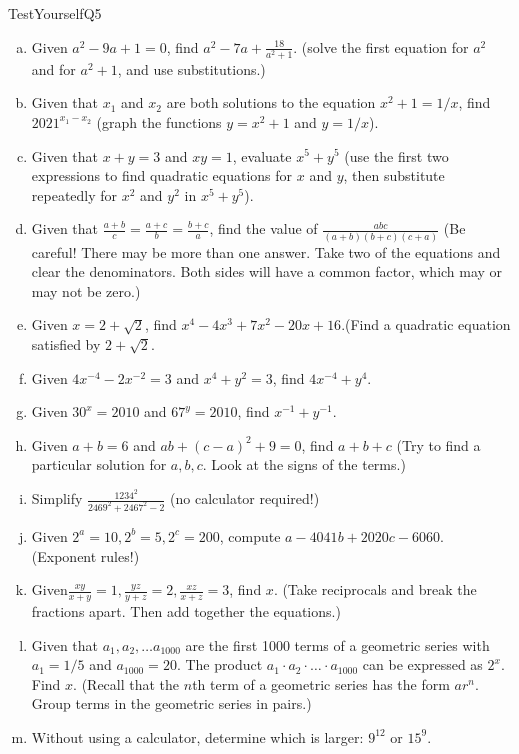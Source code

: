 \begin{exercise}{TestYourselfQ5}
\begin{enumerate}[(a)]
\item
Given $a^2-9a+1=0$, find $\displaystyle a^2 - 7a + \frac{18}{a^2+1}$.  (solve the first equation for $a^2$ and for $a^2+1$, and use  substitutions.)
\item
Given that $x_1$ and $x_2$ are both solutions to the equation $x^2+1 = 1/x$, find $2021^{x_1 - x_2}$  (graph the functions $y = x^2+1$ and $y = 1/x$).
\item
Given that $x+y=3$ and $xy=1$, evaluate $x^5 + y^5$  (use the first two expressions to find quadratic equations for $x$ and $y$, then substitute repeatedly for $x^2$ and $y^2$ in $x^5 + y^5$).
\item
Given that $\displaystyle \frac{a+b}{c} = \frac{a+c}{b} = \frac{b+c}{a}$, find the value of $\displaystyle \frac{abc}{(a+b)(b+c)(c+a)}$  (Be careful! There may be more than one answer. Take two of the equations and clear the denominators. Both sides will have a common factor, which may or may not be zero.)
\item
Given $x= 2 + \sqrt{2}$, find $x^4 - 4x^3+7x^2 - 20x + 16$.(Find a quadratic equation satisfied by $2 + \sqrt{2}$.
\item
Given $4x^{-4} - 2x^{-2}=3$ and $x^4 + y^2 = 3$, find $4x^{-4} + y^4$.
\item
Given $30^x = 2010$ and $67^y = 2010$, find $x^{-1} + y^{-1}$.
\item
Given $a+b=6$ and $ab + (c-a)^2 + 9=0$, find $a+b+c$  (Try to find a particular solution for $a,b,c$.  Look at the signs of the terms.)
\item
Simplify $\displaystyle \frac{1234^2}{2469^2 + 2467^2 - 2}$ (no calculator required!)
\item
Given $2^a = 10, 2^ b = 5, 2^c = 200$, compute $a -4041b + 2020c - 6060$. (Exponent rules!)
\item
Given$\displaystyle \frac{xy}{x+y}=1, \frac{yz}{y+z} = 2, \frac{xz}{x+z} = 3$, find $x$. (Take reciprocals and break the fractions apart.  Then add together the equations.)
\item
Given that $a_1, a_2,\ldots a_{1000}$ are the first 1000 terms of a geometric series with $a_1= 1/5$ and $a_{1000} = 20$. The product $a_1 \cdot a_2 \cdot \ldots \cdot a_{1000}$ can be expressed as $2^x$.  Find $x$. (Recall that the $n$th term of a geometric series has the form $a r^n$.  Group terms in the geometric series in pairs.)
\item
Without using a calculator, determine which is larger:  $9^{12}$ or $15^9$. 
\end{enumerate}
\end{exercise} 
